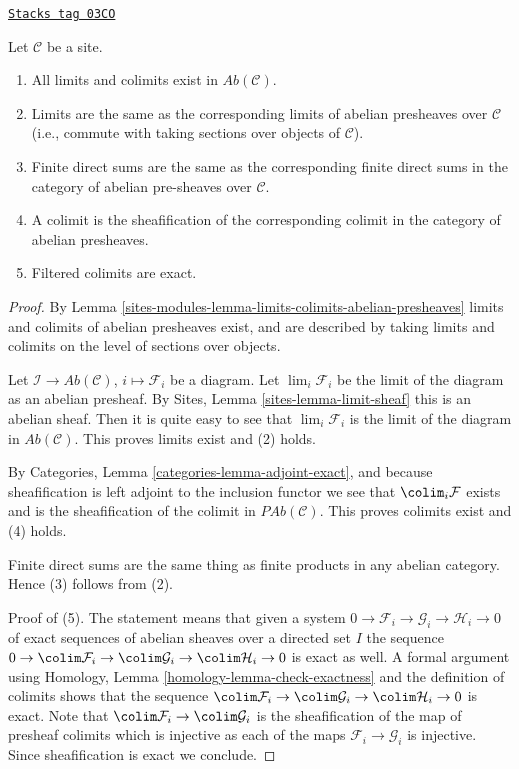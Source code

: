 \begin{lemma}
\label{sites-modules-lemma-limits-colimits-abelian-sheaves}
\href{https://stacks.math.columbia.edu/tag/03CO}{\texttt{Stacks tag 03CO}}

Let $\mathcal{C}$ be a site.
\begin{enumerate}
\item All limits and colimits exist in $\textit{Ab}(\mathcal{C})$.
\item Limits are the same as the corresponding limits of abelian presheaves
over $\mathcal{C}$ (i.e., commute with taking sections over objects of
$\mathcal{C}$).
\item Finite direct sums are the same as the corresponding finite direct sums
in the category of abelian pre-sheaves over $\mathcal{C}$.
\item A colimit is the sheafification of the corresponding colimit in
the category of abelian presheaves.
\item Filtered colimits are exact.
\end{enumerate}
\end{lemma}

\begin{proof}
By Lemma \ref{sites-modules-lemma-limits-colimits-abelian-presheaves} limits and colimits
of abelian presheaves exist, and are described by taking limits and colimits
on the level of sections over objects.

\medskip\noindent
Let $\mathcal{I} \to \textit{Ab}(\mathcal{C})$, $i \mapsto \mathcal{F}_i$
be a diagram. Let $\lim_i \mathcal{F}_i$ be the limit of the diagram
as an abelian presheaf. By Sites, Lemma \ref{sites-lemma-limit-sheaf}
this is an abelian sheaf. Then it is quite easy to see that
$\lim_i \mathcal{F}_i$ is the limit of the diagram in
$\textit{Ab}(\mathcal{C})$. This proves limits exist and (2) holds.

\medskip\noindent
By Categories, Lemma \ref{categories-lemma-adjoint-exact}, and because
sheafification is left adjoint to the inclusion functor we see that
$\colim_i \mathcal{F}$ exists and is the sheafification of the colimit
in $\textit{PAb}(\mathcal{C})$. This proves colimits exist and (4) holds.

\medskip\noindent
Finite direct sums are the same thing as finite products in any abelian
category. Hence (3) follows from (2).

\medskip\noindent
Proof of (5). The statement means that given a system
$0 \to \mathcal{F}_i \to \mathcal{G}_i \to \mathcal{H}_i \to 0$
of exact sequences of abelian sheaves over a directed set $I$ the sequence
$0 \to \colim \mathcal{F}_i \to \colim \mathcal{G}_i \to
\colim \mathcal{H}_i \to 0$ is exact as well. A formal argument using
Homology, Lemma \ref{homology-lemma-check-exactness} and the
definition of colimits shows that the sequence
$\colim \mathcal{F}_i \to \colim \mathcal{G}_i \to \colim \mathcal{H}_i \to 0$
is exact. Note that $\colim \mathcal{F}_i \to \colim \mathcal{G}_i$
is the sheafification of the map of presheaf colimits which is
injective as each of the maps $\mathcal{F}_i \to \mathcal{G}_i$ is
injective. Since sheafification is exact we conclude.
\end{proof}

